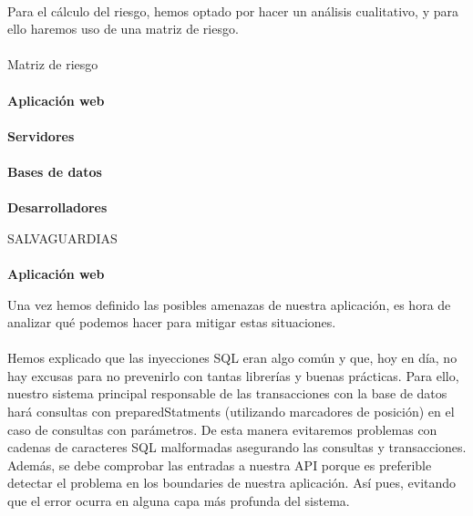 \paragraph{}
Para el cálculo del riesgo, hemos optado por hacer un análisis cualitativo, y para ello haremos uso de una matriz de riesgo.
\paragraph{}
Matriz de riesgo
\paragraph{}
\textbf{Aplicación web}
\paragraph{}
\textbf{Servidores}
\paragraph{}
\textbf{Bases de datos}
\paragraph{}
\textbf{Desarrolladores}

SALVAGUARDIAS
\paragraph{}
\textbf{Aplicación web}

Una vez hemos definido las posibles amenazas de nuestra aplicación, es hora de analizar qué podemos hacer para mitigar estas situaciones.
\paragraph{}
Hemos explicado que las inyecciones SQL eran algo común y que, hoy en día, no hay excusas para no prevenirlo con tantas librerías y buenas prácticas. Para ello, nuestro sistema principal responsable de las transacciones con la base de datos hará consultas con preparedStatments (utilizando marcadores de posición) en el caso de consultas con parámetros. De esta manera evitaremos problemas con cadenas de caracteres SQL malformadas asegurando las consultas y transacciones. Además, se debe comprobar las entradas a nuestra API porque es preferible detectar el problema en los boundaries de nuestra aplicación. Así pues, evitando que el error ocurra en alguna capa más profunda del sistema. 

